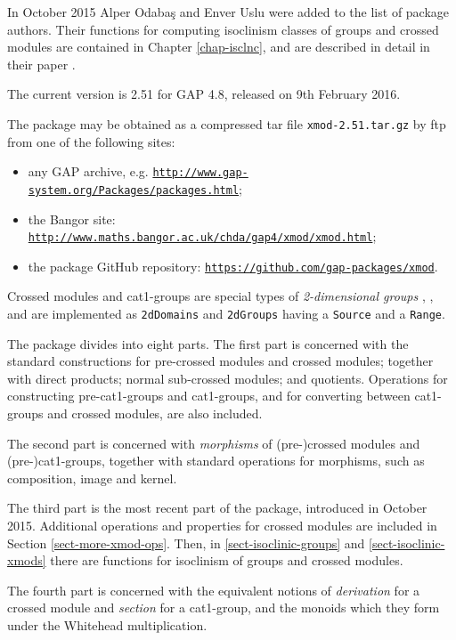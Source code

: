 \documentclass[a4paper,11pt]{report}
\begin{document}
{ In October 2015 Alper Odaba{\c s} and Enver Uslu were added to the list of
package authors. Their functions for computing isoclinism classes of groups
and crossed modules are contained in Chapter \ref{chap-isclnc}, and are described in detail in their paper \cite{IOU1}. 

 The current version is 2.51 for \textsf{GAP} 4.8, released on 9th February 2016. 

 The package may be obtained as a compressed tar file \texttt{xmod-2.51.tar.gz} by ftp from one of the following sites: 
\begin{itemize}
\item  any \textsf{GAP} archive, e.g. \href{http://www.gap-system.org/Packages/packages.html} {\texttt{http://www.gap-system.org/Packages/packages.html}}; 
\item  the Bangor site: \href{http://www.maths.bangor.ac.uk/chda/gap4/xmod/xmod.html} {\texttt{http://www.maths.bangor.ac.uk/chda/gap4/xmod/xmod.html}}; 
\item  the package GitHub repository: \href{https://github.com/gap-packages/xmod} {\texttt{https://github.com/gap-packages/xmod}}. 
\end{itemize}
 

 Crossed modules and cat1-groups are special types of \emph{2-dimensional groups} \cite{B82}, \cite{brow:hig:siv}, and are implemented as \texttt{2dDomains} and \texttt{2dGroups} having a \texttt{Source} and a \texttt{Range}.   

 The package divides into eight parts. The first part is concerned with the
standard constructions for pre-crossed modules and crossed modules; together
with direct products; normal sub-crossed modules; and quotients. Operations
for constructing pre-cat1-groups and cat1-groups, and for converting between
cat1-groups and crossed modules, are also included. 

 The second part is concerned with \emph{morphisms} of (pre-)crossed modules and (pre-)cat1-groups, together with standard
operations for morphisms, such as composition, image and kernel. 

 The third part is the most recent part of the package, introduced in October
2015. Additional operations and properties for crossed modules are included in
Section \ref{sect-more-xmod-ops}. Then, in \ref{sect-isoclinic-groups} and \ref{sect-isoclinic-xmods} there are functions for isoclinism of groups and crossed modules. 

 The fourth part is concerned with the equivalent notions of \emph{derivation} for a crossed module and \emph{section} for a cat1-group, and the monoids which they form under the Whitehead
multiplication. 

}
\end{document}

